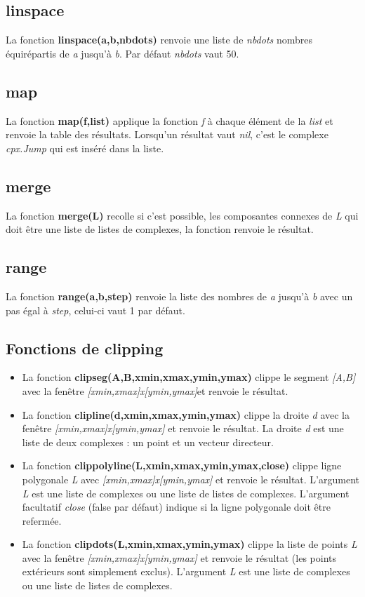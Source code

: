 \subsection{linspace}
La fonction \textbf{linspace(a,b,nbdots)} renvoie une liste de \emph{nbdots} nombres équirépartis de \emph{a} jusqu'à \emph{b}. Par défaut \emph{nbdots} vaut 50.

\subsection{map}
La fonction \textbf{map(f,list)} applique la fonction \emph{f} à chaque élément de la \emph{list} et renvoie la table des résultats. Lorsqu'un résultat vaut \emph{nil}, c'est le complexe \emph{cpx.Jump} qui est inséré dans la liste.

\subsection{merge}
La fonction \textbf{merge(L)} recolle si c'est possible, les composantes connexes de \emph{L} qui doit être une liste de listes de complexes, la fonction renvoie le résultat.

\subsection{range}
La fonction \textbf{range(a,b,step)} renvoie la liste des nombres de \emph{a} jusqu'à \emph{b} avec un pas égal à \emph{step}, celui-ci vaut 1 par défaut.

\subsection{Fonctions de clipping}

\begin{itemize}
    \item La fonction \textbf{clipseg(A,B,xmin,xmax,ymin,ymax)} clippe le segment \emph{{[}A,B{]}} avec la fenêtre \emph{{[}xmin,xmax{]}x{[}ymin,ymax{]}}et renvoie le résultat.
    \item La fonction \textbf{clipline(d,xmin,xmax,ymin,ymax)} clippe la droite \emph{d} avec la fenêtre \emph{{[}xmin,xmax{]}x{[}ymin,ymax{]}} et renvoie le résultat. La droite \emph{d} est une liste de deux complexes : un point et un vecteur directeur.
    \item La fonction \textbf{clippolyline(L,xmin,xmax,ymin,ymax,close)} clippe ligne polygonale \emph{L} avec \emph{{[}xmin,xmax{]}x{[}ymin,ymax{]}} et renvoie le résultat. L'argument \emph{L} est une liste de complexes ou une liste de listes de complexes. L'argument facultatif \emph{close} (false par défaut) indique si la ligne polygonale doit être refermée.
    \item La fonction \textbf{clipdots(L,xmin,xmax,ymin,ymax)} clippe la liste de points \emph{L} avec la fenêtre \emph{{[}xmin,xmax{]}x{[}ymin,ymax{]}} et renvoie le résultat (les points extérieurs sont simplement exclus). L'argument \emph{L} est une liste de complexes ou une liste de listes de complexes.
\end{itemize}

